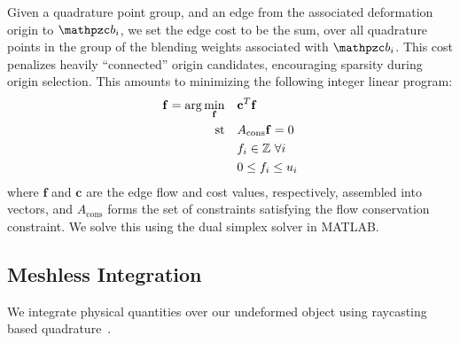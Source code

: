 Given a quadrature point group, and an edge from the associated deformation origin to $\prt_i$, we set the edge cost to be the sum, 
over all quadrature points in the group of the blending weights associated with $\prt_i$.
This cost penalizes heavily ``connected'' origin candidates, encouraging sparsity during origin selection. 
This amounts to minimizing the following integer linear program:
\begin{equation}
\begin{aligned}
\mathbf{f} =  \arg\min_{\mathbf{f}} \quad & \mathbf{c}^T \mathbf{f}    \\
\textrm{st} \quad & A_{\text{cons}} \mathbf{f} = 0  \\
                  & f_i \in \mathbb{Z} \mbox{ }\forall i	\\
                  & 0 \leq f_i \leq u_i
\end{aligned}
\end{equation}
where $\mathbf{f}$ and $\mathbf{c}$ are the edge flow and cost values, respectively, assembled into vectors, and $A_{\text{cons}}$ forms the set of constraints satisfying the flow conservation constraint. 
We solve this using the dual simplex solver in MATLAB.

\subsection{Meshless Integration}
\label{sec:quadrature}
We integrate physical quantities over our undeformed object using raycasting based quadrature~\cite{KHOSRAVIFARD201030}.

